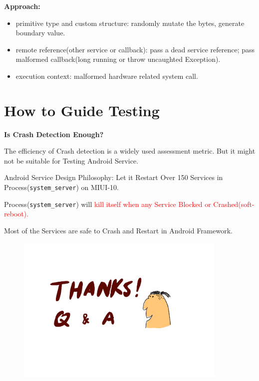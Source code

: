 \documentclass[notheorems, aspectratio=54]{beamer}
\begin{document}
\begin{frame}
	\textbf{Approach:}
	\begin{itemize}
		\item primitive type and custom structure: randomly mutate the bytes, generate boundary value.
		\item remote reference(other service or callback): pass a dead service reference; pass malformed callback(long running or throw uncaughted Exception).
		\item execution context: malformed hardware related system call.
	\end{itemize}
\end{frame}

\section{How to Guide Testing}
\begin{frame}
	
	\textbf{Is Crash Detection Enough?}
	
	The efficiency of Crash detection is a widely used assessment metric. But it might not be suitable for Testing Android Service.
	
	\begin{block}{Android Service Design Philosophy: Let it Restart}
		Over 150 Services in Process(\texttt{system\_server}) on MIUI-10.
		
		Process(\texttt{system\_server}) will \textcolor{red}{kill itself when any Service Blocked or Crashed(soft-reboot).}
		
		Most of the Services are safe to Crash and Restart in Android Framework. 
	\end{block}
\end{frame}

\begin{frame}
	\begin{figure}
		\centering
		\includegraphics[width=0.9\textwidth]{res/thanks.pdf}
	\end{figure}
\end{frame}
\end{document}
